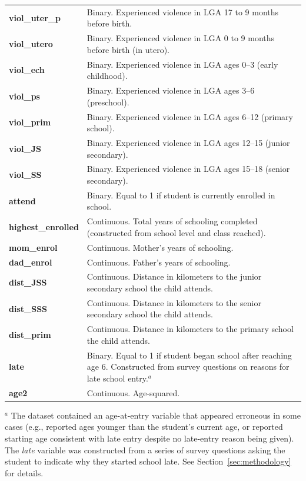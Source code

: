 \begin{longtable}{p{}p{}}
    \textbf{viol\_uter\_p}  & Binary. Experienced violence in LGA 17 to 9 months before birth. \\[0.4em]
    \textbf{viol\_utero}    & Binary. Experienced violence in LGA 0 to 9 months before birth (in utero). \\[0.4em]
    \textbf{viol\_ech}      & Binary. Experienced violence in LGA ages 0–3 (early childhood). \\[0.4em]
    \textbf{viol\_ps}       & Binary. Experienced violence in LGA ages 3–6 (preschool). \\[0.4em]
    \textbf{viol\_prim}     & Binary. Experienced violence in LGA ages 6–12 (primary school). \\[0.4em]
    \textbf{viol\_JS}       & Binary. Experienced violence in LGA ages 12–15 (junior secondary). \\[0.4em]
    \textbf{viol\_SS}       & Binary. Experienced violence in LGA ages 15–18 (senior secondary). \\[0.4em]
    \textbf{attend}         & Binary. Equal to 1 if student is currently enrolled in school. \\[0.4em]
    \textbf{highest\_enrolled} & Continuous. Total years of schooling completed (constructed from school level and class reached). \\[0.4em]
    \textbf{mom\_enrol}     & Continuous. Mother's years of schooling. \\[0.4em]
    \textbf{dad\_enrol}     & Continuous. Father's years of schooling. \\[0.4em]
    \textbf{dist\_JSS}      & Continuous. Distance in kilometers to the junior secondary school the child attends. \\[0.4em]
    \textbf{dist\_SSS}      & Continuous. Distance in kilometers to the senior secondary school the child attends. \\[0.4em]
    \textbf{dist\_prim}     & Continuous. Distance in kilometers to the primary school the child attends. \\[0.4em]
    \textbf{late}           & Binary. Equal to 1 if student began school after reaching age 6. Constructed from survey questions on reasons for late school entry.$^{a}$ \\[0.4em]
    \textbf{age2}           & Continuous. Age-squared. \\

\end{longtable}

\noindent$^{a}$ The dataset contained an age-at-entry variable that appeared
erroneous in some cases (e.g., reported ages younger than the student's
current age, or reported starting age consistent with late entry despite no
late-entry reason being given). The \textit{late} variable was constructed
from a series of survey questions asking the student to indicate why they
started school late. See Section~\ref{sec:methodology} for details.


